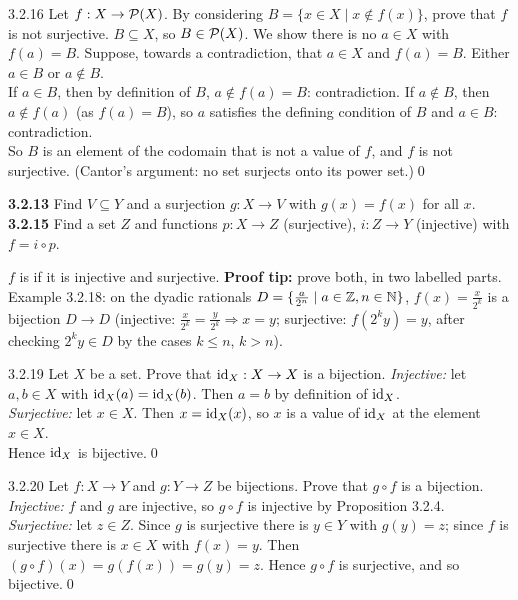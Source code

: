 \begin{bookex}[recommended]{3.2.16}
Let $f:X\to\mathcal{P}(X)$. By considering $B=\{x\in X\mid x\notin f(x)\}$, prove that $f$ is not surjective.
\solution
$B\subseteq X$, so $B\in\mathcal{P}(X)$. We show there is no $a\in X$ with $f(a)=B$. Suppose, towards a contradiction, that $a\in X$ and $f(a)=B$. Either $a\in B$ or $a\notin B$.\\
If $a\in B$, then by definition of $B$, $a\notin f(a)=B$: contradiction. If $a\notin B$, then $a\notin f(a)$ (as $f(a)=B$), so $a$ satisfies the defining condition of $B$ and $a\in B$: contradiction.\\
So $B$ is an element of the codomain that is not a value of $f$, and $f$ is not surjective. (Cantor's argument: no set surjects onto its power set.)\qed
\end{bookex}

\begin{trybox}[{3.2.13, 3.2.15 \fO}]
\textbf{3.2.13} Find $V\subseteq Y$ and a surjection $g:X\to V$ with $g(x)=f(x)$ for all $x$. \quad \textbf{3.2.15} Find a set $Z$ and functions $p:X\to Z$ (surjective), $i:Z\to Y$ (injective) with $f=i\circ p$. 
\end{trybox}

\begin{key}
$f$ is  if it is injective and surjective. \textbf{Proof tip:} prove both, in two labelled parts. Example 3.2.18: on the dyadic rationals $D=\{\frac a{2^n}\mid a\in\mathbb{Z},n\in\mathbb{N}\}$, $f(x)=\frac x{2^k}$ is a bijection $D\to D$ (injective: $\frac x{2^k}=\frac y{2^k}\Rightarrow x=y$; surjective: $f(2^ky)=y$, after checking $2^ky\in D$ by the cases $k\le n$, $k>n$).
\end{key}

\begin{bookex}[recommended]{3.2.19}
Let $X$ be a set. Prove that $\mathrm{id}_X:X\to X$ is a bijection.
\solution
\emph{Injective:} let $a,b\in X$ with $\mathrm{id}_X(a)=\mathrm{id}_X(b)$. Then $a=b$ by definition of $\mathrm{id}_X$.\\
\emph{Surjective:} let $x\in X$. Then $x=\mathrm{id}_X(x)$, so $x$ is a value of $\mathrm{id}_X$ at the element $x\in X$.\\
Hence $\mathrm{id}_X$ is bijective.\qed
\end{bookex}

\begin{bookex}[essential]{3.2.20}
Let $f:X\to Y$ and $g:Y\to Z$ be bijections. Prove that $g\circ f$ is a bijection.
\solution
\emph{Injective:} $f$ and $g$ are injective, so $g\circ f$ is injective by Proposition 3.2.4.\\
\emph{Surjective:} let $z\in Z$. Since $g$ is surjective there is $y\in Y$ with $g(y)=z$; since $f$ is surjective there is $x\in X$ with $f(x)=y$. Then $(g\circ f)(x)=g(f(x))=g(y)=z$. Hence $g\circ f$ is surjective, and so bijective.\qed
\end{bookex}

